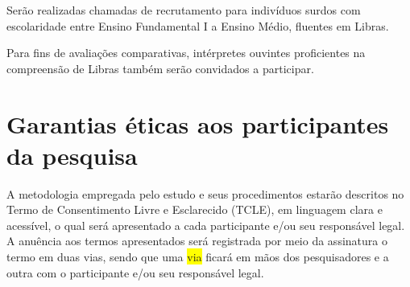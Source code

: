 \documentclass[a4paper,11pt,titlepage,singlespacing]{article}
\begin{document}
Serão realizadas chamadas de recrutamento para indivíduos surdos com escolaridade entre Ensino Fundamental I a Ensino Médio, fluentes em Libras.






Para fins de avaliações comparativas, intérpretes ouvintes proficientes na compreensão de Libras também serão convidados a participar.







\section{Garantias éticas aos participantes da pesquisa}
A metodologia empregada pelo estudo e seus procedimentos estarão descritos no Termo de Consentimento Livre e Esclarecido (TCLE), em linguagem clara e acessível, o qual será apresentado a cada participante e/ou seu responsável legal. A anuência aos termos apresentados será registrada por meio da assinatura o termo em duas vias, sendo que uma \colorbox{yellow}{via}
ficará em mãos dos pesquisadores e a outra com o participante e/ou seu responsável legal.
\end{document}
